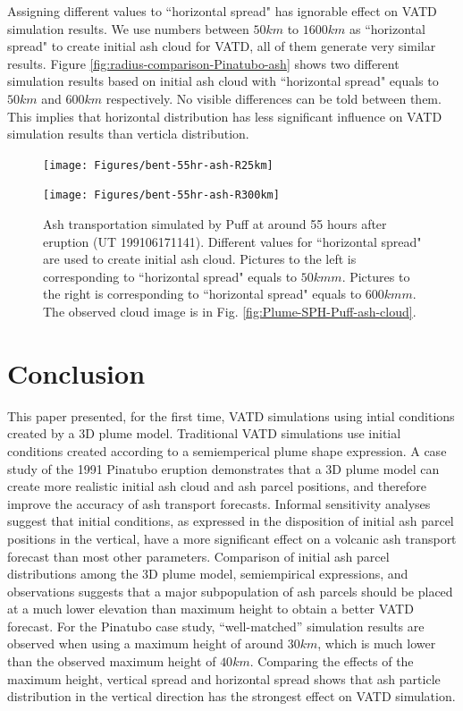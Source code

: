 \documentclass[draft,linenumbers]{agujournal2019}
\begin{document}
Assigning different values to ``horizontal spread" has ignorable effect on VATD simulation results. We use numbers between $50 km$ to $1600 km$ as ``horizontal spread" to create initial ash cloud for VATD, all of them generate very similar results. Figure \ref{fig:radius-comparison-Pinatubo-ash} shows two different simulation results based on initial ash cloud with ``horizontal spread" equals to $50 km$ and $600 km$ respectively. No visible differences can be told between them. This implies that horizontal distribution has less significant influence on VATD simulation results than verticla distribution.

\begin{figure}[!htb]
\centering
    \begin{minipage}{.325 \textwidth}
        \centering
        \texttt{[image: Figures/bent-55hr-ash-R25km]}
    \end{minipage}%
    \begin{minipage}{.325 \textwidth}
        \centering
        \texttt{[image: Figures/bent-55hr-ash-R300km]}
    \end{minipage}%
    \caption{Ash transportation simulated by Puff at around 55 hours after eruption (UT 199106171141). Different values for ``horizontal spread" are used to create initial ash cloud. Pictures to the left is corresponding to ``horizontal spread" equals to $50 km m$. Pictures to the right is corresponding to ``horizontal spread" equals to $600 km m$. The observed cloud image is in Fig. \ref{fig:Plume-SPH-Puff-ash-cloud}.}
    \label{fig:ash-distribution-horizontal-compare}
\end{figure}

\section{Conclusion}

This paper presented, for the first time, VATD simulations using intial conditions created by a 3D plume model.  Traditional VATD simulations use initial conditions created according to a semiemperical plume shape expression. A case study of the 1991 Pinatubo eruption demonstrates that a 3D plume model can create more realistic initial ash cloud and ash parcel positions, and therefore improve the accuracy of ash transport forecasts.  Informal sensitivity analyses suggest that initial conditions, as expressed in the disposition of initial ash parcel positions in the vertical, have a more significant effect on a volcanic ash transport forecast than most other parameters. Comparison of initial ash parcel distributions among the 3D plume model, semiempirical expressions, and observations suggests that a major subpopulation of ash parcels should be placed at a much lower elevation than maximum height to obtain a better VATD forecast. For the Pinatubo case study, ``well-matched'' simulation results are observed when using a maximum height of around $30 km$, which is much lower than the observed maximum height of $40 km$. Comparing the effects of the maximum height, vertical spread and horizontal spread shows that ash particle distribution in the vertical direction has the strongest effect on VATD simulation.
\end{document}
